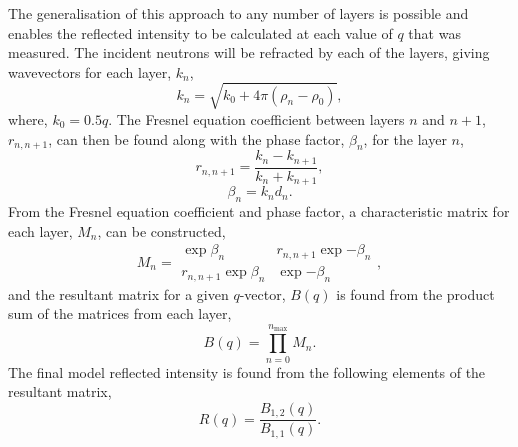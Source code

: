 \documentclass[
 reprint,
 superscriptaddress,
 amsmath,amssymb,
 aps,
]{revtex4-1}
\begin{document}
The generalisation of this approach to any number of layers is possible and enables the reflected intensity to be calculated at each value of $q$ that was measured. 
The incident neutrons will be refracted by each of the layers, giving wavevectors for each layer, $k_n$,
%
\begin{equation}
    k_n = \sqrt{k_0+4\pi(\rho_n - \rho_0)},
\end{equation}
%
where, $k_0 = 0.5q$. 
The Fresnel equation coefficient between layers $n$ and $n+1$, $r_{n, n+1}$, can then be found along with the phase factor, $\beta_n$, for the layer $n$, 
%
\begin{equation}
    r_{n, n+1} = \frac{k_n - k_{n+1}}{k_n + k_{n+1}}, 
    \label{equ:fres}
\end{equation}
%
%
\begin{equation}
    \beta_n = k_nd_n.
\end{equation}
%
From the Fresnel equation coefficient and phase factor, a characteristic matrix for each layer, $M_n$, can be constructed,
%
\begin{equation}
    M_n = 
    \begin{matrix}
        \exp{\beta_n} & r_{n,n+1}\exp{-\beta_n} \\ 
        r_{n,n+1}\exp{\beta_n} & \exp{-\beta_n}
    \end{matrix},
\end{equation}
%
and the resultant matrix for a given $q$-vector, $B(q)$ is found from the product sum of the matrices from each layer, 
%
\begin{equation}
    B(q) = \prod_{n=0}^{n_{\text{max}}}{M_n}.
\end{equation}
%
The final model reflected intensity is found from the following elements of the resultant matrix, 
%
\begin{equation}
    R(q) = \frac{B_{1,2}(q)}{B_{1,1}(q)}. 
\end{equation}
%
\end{document}
